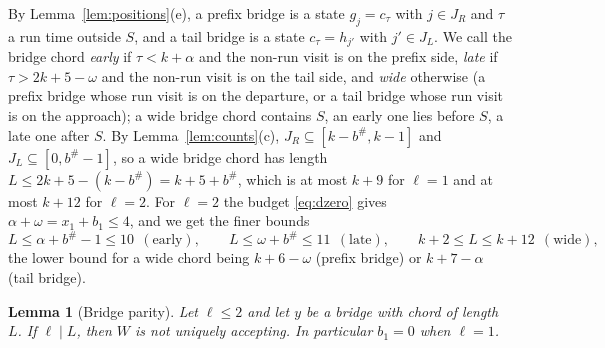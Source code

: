 \documentclass[11pt]{article}
\newtheorem{lemma}[theorem]{Lemma}
\theoremstyle{definition}
\begin{document}
By Lemma~\ref{lem:positions}(e), a prefix bridge is a state $g_j=c_\tau$
with $j\in J_R$ and $\tau$ a run time outside $S$, and a tail bridge is a
state $c_\tau=h_{j'}$ with $j'\in J_L$. We call the bridge chord
\emph{early} if $\tau<k+\alpha$ and the non-run visit is on the prefix side,
\emph{late} if $\tau>2k+5-\omega$ and the non-run visit is on the tail side,
and \emph{wide} otherwise (a prefix bridge whose run visit is on the departure,
or a tail bridge whose run visit is on the approach); a wide bridge chord
contains $S$, an early one lies before $S$, a late one after $S$. By
Lemma~\ref{lem:counts}(c), $J_R\subseteq[k-b^{\#},k-1]$ and
$J_L\subseteq[0,b^{\#}-1]$, so a wide bridge chord has length
$L\le 2k+5-(k-b^{\#})=k+5+b^{\#}$, which is at most $k+9$ for $\ell=1$ and at
most $k+12$ for $\ell=2$. For $\ell=2$ the budget \eqref{eq:dzero} gives
$\alpha+\omega=x_1+b_1\le4$, and we get the finer bounds
\begin{equation}\label{eq:bridgelen}
L\le \alpha+b^{\#}-1\le10\ \ (\text{early}),\qquad
L\le \omega+b^{\#}\le 11\ \ (\text{late}),\qquad
k+2\le L\le k+12\ \ (\text{wide}),
\end{equation}
the lower bound for a wide chord being $k+6-\omega$ (prefix bridge) or
$k+7-\alpha$ (tail bridge).

\begin{lemma}[Bridge parity]\label{lem:bridgeparity}
Let $\ell\le2$ and let $y$ be a bridge with chord of length $L$. If
$\ell\mid L$, then $W$ is not uniquely accepting. In particular $b_1=0$ when
$\ell=1$.
\end{lemma}
\end{document}
